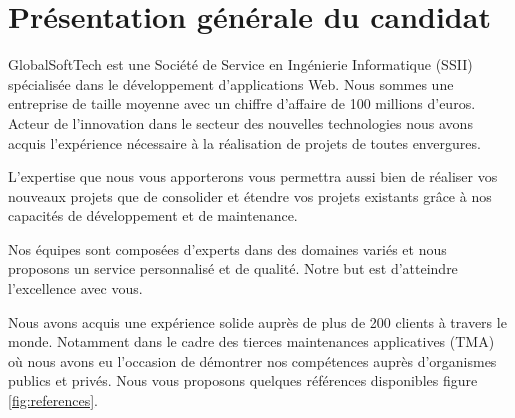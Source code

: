 \chapter{Présentation générale du candidat}
	GlobalSoftTech est une Société de Service en Ingénierie Informatique (SSII) spécialisée dans le développement d’applications Web. Nous sommes une entreprise de taille moyenne avec un chiffre d’affaire de 100 millions d’euros. Acteur de l’innovation dans le secteur des nouvelles technologies nous avons acquis l’expérience nécessaire à la réalisation de projets de toutes envergures. 
	
	L'expertise que nous vous apporterons vous permettra aussi bien de réaliser vos nouveaux projets que de consolider et étendre vos projets existants grâce à nos capacités de développement et de maintenance.
	
	Nos équipes sont composées d’experts dans des domaines variés et nous proposons un service personnalisé et de qualité. Notre but est d’atteindre l’excellence avec vous. 
	
	Nous avons acquis une expérience solide auprès de plus de 200 clients à travers le monde. Notamment dans le cadre des tierces maintenances applicatives (TMA) où nous avons eu l’occasion de démontrer nos compétences auprès d’organismes publics et privés. Nous vous proposons quelques références disponibles figure \ref{fig:references}.
	
